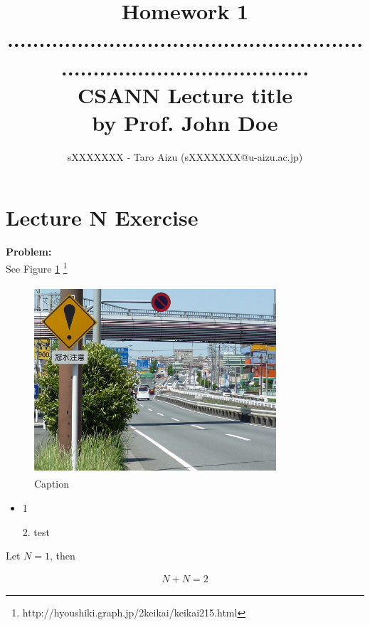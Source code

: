 \documentclass[a4paper,16pt]{article}
\author{sXXXXXXX - Taro Aizu (sXXXXXXX@u-aizu.ac.jp)}
\title{Homework 1 \\ ...............................................................................................\\CSANN Lecture title  \\ {\large by Prof. John Doe}}
\begin{document}
\maketitle


\section*{Lecture N Exercise}
{\bf Problem:} \\
See Figure \ref{graph:other}
\footnote{http://hyoushiki.graph.jp/2keikai/keikai215.html}

\begin{figure}[htbp!]
 \begin{center}
  \includegraphics[width=9cm, height=7cm]{./img/image.jpg}
  \caption{Caption}
  \label{graph:other}
 \end{center}
\end{figure}

\begin{itemize}
  \item 1
  \item[2.] test
\end{itemize}

Let $N = 1$, then

\begin{eqnarray*}
  N + N = 2
\end{eqnarray*}
\end{document}
